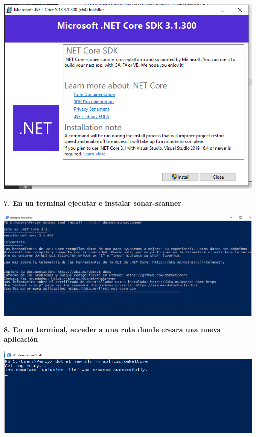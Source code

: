 \documentclass[12pt,letterpaper]{article}
\begin{document}
    \begin{center}
		\includegraphics[width=15cm]{./Imagenes/8} 
	\end{center}

\textbf{7. En un terminal ejecutar e instalar sonar-scanner}

    \begin{center}
		\includegraphics[width=15cm]{./Imagenes/9} 
	\end{center}

\textbf{8. En un terminal, acceder a una ruta donde creara una nueva aplicación}

    \begin{center}
		\includegraphics[width=15cm]{./Imagenes/10} 
	\end{center}
	
\end{document}
